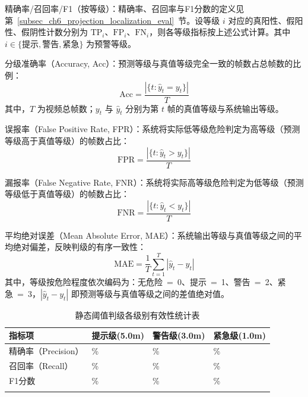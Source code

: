 精确率/召回率/F1（按等级）：精确率、召回率与F1分数的定义见第~\ref{subsec_ch6_projection_localization_eval}~节。设等级 $i$ 对应的真阳性、假阳性、假阴性计数分别为 $\mathrm{TP}_i$、$\mathrm{FP}_i$、$\mathrm{FN}_i$，则各等级指标按上述公式计算。其中 $i\in\{\text{提示},\text{警告},\text{紧急}\}$ 为预警等级。

分级准确率（Accuracy, Acc）：预测等级与真值等级完全一致的帧数占总帧数的比例：
\begin{equation}
\mathrm{Acc}=\frac{|\{t:\hat{y}_t=y_t\}|}{T}
\label{eq:acc}
\end{equation}
其中，$T$ 为视频总帧数；$y_t$ 与 $\hat{y}_t$ 分别为第 $t$ 帧的真值等级与系统输出等级。

误报率（False Positive Rate, FPR）：系统将实际低等级危险判定为高等级（预测等级高于真值等级）的帧数占比：
\begin{equation}
\mathrm{FPR}=\frac{|\{t:\hat{y}_t>y_t\}|}{T}
\label{eq:far}
\end{equation}

漏报率（False Negative Rate, FNR）：系统将实际高等级危险判定为低等级（预测等级低于真值等级）的帧数占比：
\begin{equation}
\mathrm{FNR}=\frac{|\{t:\hat{y}_t<y_t\}|}{T}
\label{eq:mdr}
\end{equation}

平均绝对误差（Mean Absolute Error, MAE）：系统输出等级与真值等级之间的平均绝对偏差，反映判级的有序一致性：
\begin{equation}
\mathrm{MAE}=\frac{1}{T}\sum_{t=1}^{T}|\hat{y}_t-y_t|
\label{eq:mae}
\end{equation}
其中，等级按危险程度依次编码为：无危险~=~0、提示~=~1、警告~=~2、紧急~=~3，$|\hat{y}_t-y_t|$ 即预测等级与真值等级之间的差值绝对值。

\begin{table}[htbp]
\centering
\caption{静态阈值判级各级别有效性统计表}
\label{tab:ch6_d4a_static_warning_levels}
\begin{tabular*}{\textwidth}{@{\extracolsep{\fill}}>{\centering\arraybackslash}m{4.1cm}>{\centering\arraybackslash}m{2.3cm}>{\centering\arraybackslash}m{2.3cm}>{\centering\arraybackslash}m{2.3cm}}
\Xhline{1pt}
\textbf{指标项} & \textbf{提示级(5.0m)} & \textbf{警告级(3.0m)} & \textbf{紧急级(1.0m)} \\
\hline
精确率（Precision）  & 57.27\% & 90.12\% & 94.66\% \\
召回率（Recall）  & 39.37\% & 81.11\% & 93.00\% \\
F1分数  & 46.67\% & 85.38\% & 93.83\% \\
\Xhline{1pt}
\end{tabular*}
\end{table}

